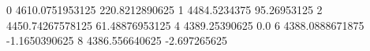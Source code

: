 0 4610.0751953125 220.8212890625
1 4484.5234375 95.26953125
2 4450.74267578125 61.48876953125
4 4389.25390625 0.0
6 4388.0888671875 -1.1650390625
8 4386.556640625 -2.697265625
